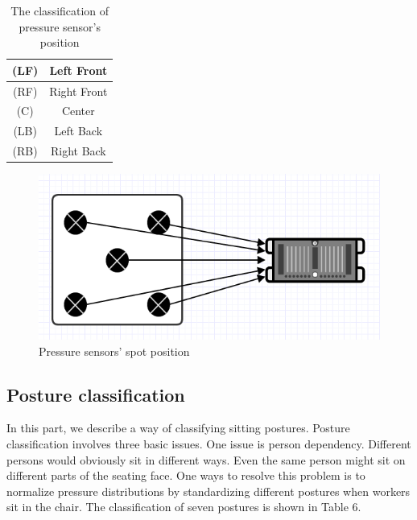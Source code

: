 \documentclass[conference]{IEEEtran}
\begin{document}
 \begin{table}[h]
{\renewcommand\arraystretch{1.25}
\caption{The classification of pressure sensor's position}
\begin{tabular}{|c|cc}  \hline\hline
(LF)& \multicolumn{2}{p{7cm}|}{\raggedright Left Front} \\ \hline
(RF)& \multicolumn{2}{p{7cm}|}{\raggedright Right Front} \\ \hline
(C)& \multicolumn{2}{p{7cm}|}{\raggedright Center} \\ \hline
(LB)& \multicolumn{2}{p{7cm}|}{\raggedright Left Back} \\ \hline
(RB)& \multicolumn{2}{p{7cm}|}{\raggedright Right Back} \\ \hline \hline
\end{tabular}}
\end{table}


\begin{figure}[H]
\begin{center}
    \includegraphics[scale=0.5]{img_08.png}
    \caption{Pressure sensors' spot position} 
\end{center}
\end{figure}

\subsection{Posture classification\\}

In this part, we describe a way of classifying sitting postures. Posture classification involves three basic issues. One issue is person dependency. Different persons would obviously sit in different ways. Even the same person might sit on different parts of the seating face. One ways to resolve this problem is to normalize pressure distributions by standardizing different postures when workers sit in the chair. The classification of seven postures is shown in Table 6.
\end{document}
